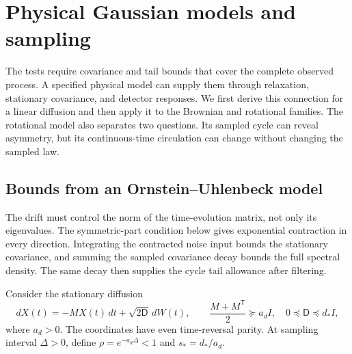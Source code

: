 \section{Physical Gaussian models and sampling}
\label{phys16:section}

The tests require covariance and tail bounds that cover the complete observed process. A specified physical model can supply them through relaxation, stationary covariance, and detector responses. We first derive this connection for a linear diffusion and then apply it to the Brownian and rotational families. The rotational model also separates two questions. Its sampled cycle can reveal asymmetry, but its continuous-time circulation can change without changing the sampled law.

\subsection{Bounds from an Ornstein--Uhlenbeck model}

The drift must control the norm of the time-evolution matrix, not only its eigenvalues. The symmetric-part condition below gives exponential contraction in every direction. Integrating the contracted noise input bounds the stationary covariance, and summing the sampled covariance decay bounds the full spectral density. The same decay then supplies the cycle tail allowance after filtering.

Consider the stationary diffusion
\begin{equation}
 dX(t)=-M X(t)\,dt+\sqrt{2\mathsf D}\,dW(t),
 \qquad \frac{M+M^{\mathsf T}}2\succeq a_dI,
 \quad 0\preceq\mathsf D\preceq d_*I,
 \label{phys16:ou}
\end{equation}
where $a_d>0$. The coordinates have even time-reversal parity. At sampling interval $\Delta>0$, define $\rho=e^{-a_d\Delta}<1$ and $s_*=d_*/a_d$.

